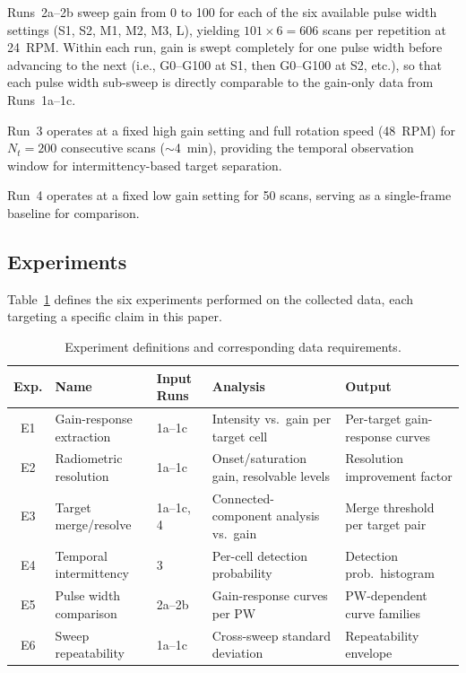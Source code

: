 \documentclass[colorlinks,upint,balance]{asmeconf}
\begin{document}
Runs~2a--2b sweep gain from 0 to 100 for each of the six available pulse width settings (S1, S2, M1, M2, M3, L), yielding $101 \times 6 = 606$ scans per repetition at 24~RPM. Within each run, gain is swept completely for one pulse width before advancing to the next (i.e., G0--G100 at S1, then G0--G100 at S2, etc.), so that each pulse width sub-sweep is directly comparable to the gain-only data from Runs~1a--1c.

Run~3 operates at a fixed high gain setting and full rotation speed (48~RPM) for $N_t = 200$ consecutive scans ($\sim$4~min), providing the temporal observation window for intermittency-based target separation.

Run~4 operates at a fixed low gain setting for 50 scans, serving as a single-frame baseline for comparison.

\subsection{Experiments}

Table~\ref{tab:experiments} defines the six experiments performed on the collected data, each targeting a specific claim in this paper.

\begin{table}[t]
\caption{Experiment definitions and corresponding data requirements.}
\label{tab:experiments}
\centering
\begin{tabular}{c l l l l}
\toprule
\textbf{Exp.} & \textbf{Name} & \textbf{Input Runs} & \textbf{Analysis} & \textbf{Output} \\
\midrule
E1 & Gain-response extraction & 1a--1c & Intensity vs.\ gain per target cell & Per-target gain-response curves \\
E2 & Radiometric resolution & 1a--1c & Onset/saturation gain, resolvable levels & Resolution improvement factor \\
E3 & Target merge/resolve & 1a--1c, 4 & Connected-component analysis vs.\ gain & Merge threshold per target pair \\
E4 & Temporal intermittency & 3 & Per-cell detection probability & Detection prob.\ histogram \\
E5 & Pulse width comparison & 2a--2b & Gain-response curves per PW & PW-dependent curve families \\
E6 & Sweep repeatability & 1a--1c & Cross-sweep standard deviation & Repeatability envelope \\
\bottomrule
\end{tabular}
\end{table}
\end{document}
